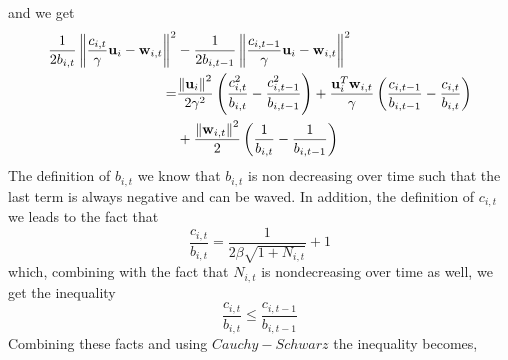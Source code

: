 and we get
\begin{equation*}
\begin{split}
\frac{1}{2b_{i,t}}\left\Vert {\frac{c_{i,t}}{\gamma} \mathbf{u}_i-\mathbf{w}_{i,t}} \right\Vert^2&-\frac{1}{2b_{i,t-1}}\left\Vert {\frac{c_{i,t-1}}{\gamma} \mathbf{u}_i-\mathbf{w}_{i,t}} \right\Vert^2\\
=&\frac{\left\Vert {\mathbf{u}_i} \right\Vert^2}{2\gamma^2}\left({\frac{c_{i,t}^2}{b_{i,t}}-\frac{c_{i,t-1}^2}{b_{i,t-1}}}\right)+
\frac{\mathbf{u}_i^T\mathbf{w}_{i,t}}{\gamma}\left({\frac{c_{i,t-1}}{b_{i,t-1}}-\frac{c_{i,t}}{b_{i,t}}}\right)\\
&+\frac{\left\Vert {\mathbf{w}_{i,t}} \right\Vert^2}{2}\left({\frac{1}{b_{i,t}}-\frac{1}{b_{i,t-1}}}\right)
\end{split}
\end{equation*}
The definition of $b_{i,t}$ we know that $b_{i,t}$ is non decreasing over time such that the last term is always negative and can be waved. In addition,  the definition of $c_{i,t}$ we leads to the fact that  
\begin{equation*}
\frac{c_{i,t}}{b_{i,t}}=\frac{1}{2\beta\sqrt{1+N_{i,t}}}+1
\end{equation*}
which, combining with the fact that $N_{i,t}$ is nondecreasing over time as well, we get the inequality 
\begin{equation*}
\frac{c_{i,t}}{b_{i,t}}\le\frac{c_{i,t-1}}{b_{i,t-1}}
\end{equation*}
Combining these facts and using $Cauchy-Schwarz$ the inequality becomes,

